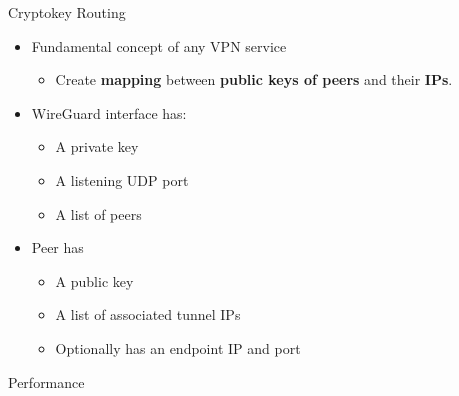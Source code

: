 \documentclass{beamer}
\begin{document}
    \begin{frame}{Cryptokey Routing}
        \begin{itemize}
            \item Fundamental concept of any VPN service
                \begin{itemize}
                    \item Create \textbf{mapping} between \textbf{public keys of peers} and their \textbf{IPs}.
                \end{itemize}
            \item WireGuard interface has:
                \begin{itemize}
                    \item A private key
                    \item A listening UDP port
                    \item A list of peers
                \end{itemize}
            \item Peer has
                \begin{itemize}
                    \item A public key
                    \item A list of associated tunnel IPs
                    \item Optionally has an endpoint IP and port
                \end{itemize}
        \end{itemize}
    \end{frame}
    \begin{frame}[fragile]{Performance}
        \begin{figure}
            \hspace*{-1cm} %
            \label{fig:example}%
        \end{figure}
    \end{frame}
\end{document}

